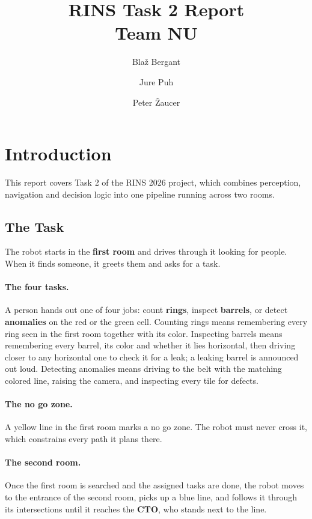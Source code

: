 \documentclass[a4paper, 11pt]{article}
\title{RINS Task 2 Report \\[2pt] \large Team NU}
\author{Blaž Bergant \and Jure Puh \and Peter Žaucer}
\date{}
\begin{document}
\maketitle

\section{Introduction}

This report covers Task 2 of the RINS 2026 project, which combines perception,
navigation and decision logic into one pipeline running across two rooms.

\subsection{The Task}

The robot starts in the \textbf{first room} and drives through it looking for people.
When it finds someone, it greets them and asks for a task.

\paragraph{The four tasks.}
A person hands out one of four jobs: count \textbf{rings}, inspect \textbf{barrels}, or
detect \textbf{anomalies} on the red or the green cell. Counting rings means remembering
every ring seen in the first room together with its color. Inspecting barrels means
remembering every barrel, its color and whether it lies horizontal, then driving closer
to any horizontal one to check it for a leak; a leaking barrel is announced out loud.
Detecting anomalies means driving to the belt with the matching colored line, raising
the camera, and inspecting every tile for defects.

\paragraph{The no go zone.}
A yellow line in the first room marks a no go zone. The robot must never cross it, which
constrains every path it plans there.

\paragraph{The second room.}
Once the first room is searched and the assigned tasks are done, the robot moves to the
entrance of the second room, picks up a blue line, and follows it through its
intersections until it reaches the \textbf{CTO}, who stands next to the line.
\end{document}
